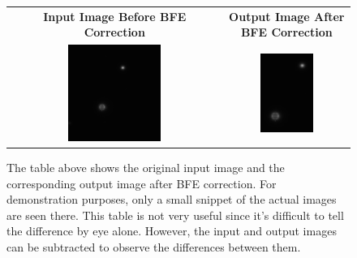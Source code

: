 \documentclass[DM,authoryear,toc]{lsstdoc}
\begin{document}
\begin{figure}[h]
\centering
  \begin{tabular}[t]{cc}
    \textbf{Input Image Before BFE Correction} & \textbf{Output Image After BFE Correction}\\
    \includegraphics[trim=5.55cm 5.35cm 7.1cm 3.25cm,clip=true,width=0.45\textwidth]{./figs/fig15/input_snippet.png} &
    \includegraphics[width=0.45\textwidth]{./figs/fig15/LSST_ouput_snippet.png} \\
  \end{tabular}
\caption{The table above shows the original input image and the corresponding output image after BFE correction. For demonstration purposes, only a small snippet of the actual images are seen there. This table is not very useful since it's difficult to tell the difference by eye alone. However, the input and output images can be subtracted to observe the differences between them.}
\label{fig:bfeinvsout}
\end{figure}
\end{document}
